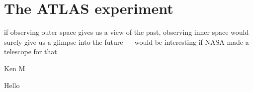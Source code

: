 \chapter{The ATLAS experiment}
\label{chapter:experiment}

\epigraph{%
if observing outer space gives us a view of the past, observing inner space
would surely give us a glimpse into the future --- would be interesting if NASA
made a telescope for that%
}%
{Ken M}

Hello
